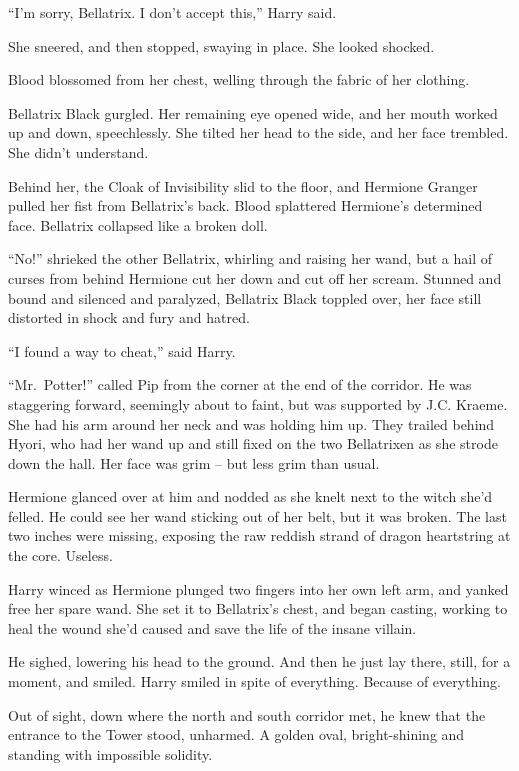 ``I'm sorry, Bellatrix. I don't accept this,'' Harry said.

She sneered, and then stopped, swaying in place. She looked shocked.

Blood blossomed from her chest, welling through the fabric of her
clothing.

Bellatrix Black gurgled. Her remaining eye opened wide, and her mouth
worked up and down, speechlessly. She tilted her head to the side, and
her face trembled. She didn't understand.

Behind her, the Cloak of Invisibility slid to the floor, and Hermione
Granger pulled her fist from Bellatrix's back. Blood splattered
Hermione's determined face. Bellatrix collapsed like a broken doll.

``No!'' shrieked the other Bellatrix, whirling and raising her wand, but
a hail of curses from behind Hermione cut her down and cut off her
scream. Stunned and bound and silenced and paralyzed, Bellatrix Black
toppled over, her face still distorted in shock and fury and hatred.

``I found a way to cheat,'' said Harry.

``Mr.~Potter!'' called Pip from the corner at the end of the corridor.
He was staggering forward, seemingly about to faint, but was supported
by J.C. Kraeme. She had his arm around her neck and was holding him up.
They trailed behind Hyori, who had her wand up and still fixed on the
two Bellatrixen as she strode down the hall. Her face was grim -- but
less grim than usual.

Hermione glanced over at him and nodded as she knelt next to the witch
she'd felled. He could see her wand sticking out of her belt, but it was
broken. The last two inches were missing, exposing the raw reddish
strand of dragon heartstring at the core. Useless.

Harry winced as Hermione plunged two fingers into her own left arm, and
yanked free her spare wand. She set it to Bellatrix's chest, and began
casting, working to heal the wound she'd caused and save the life of the
insane villain.

He sighed, lowering his head to the ground. And then he just lay there,
still, for a moment, and smiled. Harry smiled in spite of everything.
Because of everything.

Out of sight, down where the north and south corridor met, he knew that
the entrance to the Tower stood, unharmed. A golden oval, bright-shining
and standing with impossible solidity.

